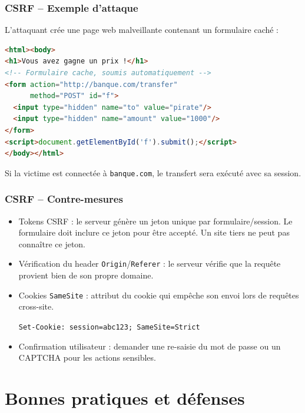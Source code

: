 \documentclass{beamer}
\begin{document}
\begin{frame}[fragile]
\frametitle{CSRF -- Exemple d'attaque}

L'attaquant crée une page web malveillante contenant un formulaire caché :

\begin{lstlisting}[language=HTML,title={\texttt{Page malveillante}}]
<html><body>
<h1>Vous avez gagne un prix !</h1>
<!-- Formulaire cache, soumis automatiquement -->
<form action="http://banque.com/transfer"
      method="POST" id="f">
  <input type="hidden" name="to" value="pirate"/>
  <input type="hidden" name="amount" value="1000"/>
</form>
<script>document.getElementById('f').submit();</script>
</body></html>
\end{lstlisting}

Si la victime est connectée à \texttt{banque.com}, le transfert sera exécuté avec sa session.
\end{frame}


\begin{frame}
\frametitle{CSRF -- Contre-mesures}

\begin{itemize}
\item \alert{Tokens CSRF} : le serveur génère un jeton unique par formulaire/session. Le formulaire doit inclure ce jeton pour être accepté. Un site tiers ne peut pas connaître ce jeton.
\item \alert{Vérification du header \texttt{Origin}/\texttt{Referer}} : le serveur vérifie que la requête provient bien de son propre domaine.
\item \alert{Cookies \texttt{SameSite}} : attribut du cookie qui empêche son envoi lors de requêtes cross-site.
\begin{center}
\texttt{Set-Cookie: session=abc123; SameSite=Strict}
\end{center}
\item \alert{Confirmation utilisateur} : demander une re-saisie du mot de passe ou un CAPTCHA pour les actions sensibles.
\end{itemize}
\end{frame}


\section{Bonnes pratiques et défenses}
\end{document}

